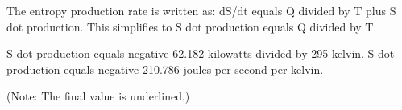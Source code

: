 The entropy production rate is written as:  
dS/dt equals Q divided by T plus S dot production.  
This simplifies to S dot production equals Q divided by T.  

S dot production equals negative 62.182 kilowatts divided by 295 kelvin.  
S dot production equals negative 210.786 joules per second per kelvin.  

(Note: The final value is underlined.)